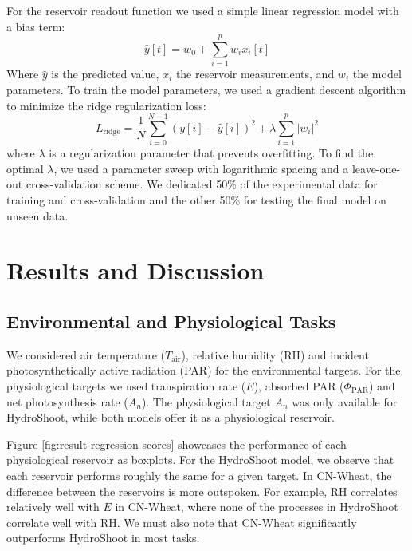 \documentclass[10pt,a4paper,journal]{IEEEtran}
\begin{document}
For the reservoir readout function we used a simple linear regression model with a bias term:
\begin{equation} \label{eq:readout}
\hat{y}[t] = w_0 + \sum_{i=1}^{p} w_i x_i[t]
\end{equation}
Where $\hat{y}$ is the predicted value, $x_{i}$ the reservoir measurements, and $w_i$ the model parameters.
To train the model parameters, we used a gradient descent algorithm to minimize the ridge regularization loss:
\begin{equation} \label{eq:l2-regularization}
    L_{\text{ridge}} = \frac{1}{N} \sum_{i=0}^{N-1} \left(y[i] - \hat{y}[i] \right)^2 + \lambda \sum_{i=1}^{p} |w_i|^2
\end{equation}
where $\lambda$ is a regularization parameter that prevents overfitting.
To find the optimal \(\lambda\), we used a parameter sweep with logarithmic spacing and a leave-one-out cross-validation scheme.
We dedicated 50\% of the experimental data for training and cross-validation and the other 50\% for testing the final model on unseen data.





\section{Results and Discussion}

\subsection{Environmental and Physiological Tasks}

We considered air temperature ($T_{\text{air}}$), relative humidity (RH) and incident photosynthetically active radiation (PAR) for the environmental targets.
For the physiological targets we used transpiration rate ($E$), absorbed PAR ($\Phi_{\text{PAR}}$) and net photosynthesis rate ($A_n$). 
The physiological target $A_n$ was only available for HydroShoot, while both models offer it as a physiological reservoir.

Figure \ref{fig:result-regression-scores} showcases the performance of each physiological reservoir as boxplots.
For the HydroShoot model, we observe that each reservoir performs roughly the same for a given target.
In CN-Wheat, the difference between the reservoirs is more outspoken.
For example, RH correlates relatively well with $E$ in CN-Wheat, where none of the processes in HydroShoot correlate well with RH.
We must also note that CN-Wheat significantly outperforms HydroShoot in most tasks.
\end{document}
